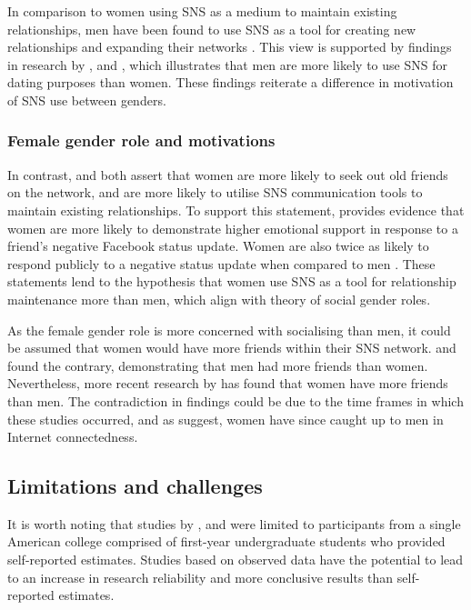 In comparison to women using SNS as a medium to maintain existing relationships, men have been found to use SNS as a tool for creating new relationships and expanding their networks \citep{Mazman2011}. This view is supported by findings in research by \citet{Muscanell2012}, \citet{Raacke2008} and \citet{Haferkamp2012}, which illustrates that men are more likely to use SNS for dating purposes than women. These findings reiterate a difference in motivation of SNS use between genders. 

\subsubsection{Female gender role and motivations}

In contrast, \citet{Mazman2011} and \citet{Muscanell2012} both assert that women are more likely to seek out old friends on the network, and are more likely to utilise SNS communication tools to maintain existing relationships. To support this statement, \citet{Joiner2014} provides evidence that women are more likely to demonstrate higher emotional support in response to a friend's negative Facebook status update. Women are also twice as likely to respond publicly to a negative status update when compared to men \citep[p. 167]{Joiner2014}. These statements lend to the hypothesis that women use SNS as a tool for relationship maintenance more than men, which align with  theory of social gender roles.

As the female gender role is more concerned with socialising than men, it could be assumed that women would have more friends within their SNS network. \citet{Raacke2008} and \citet{Fogel2009} found the contrary, demonstrating that men had more friends than women. Nevertheless, more recent research by \citet{McAndrew2012} has found that women have more friends than men. The contradiction in findings could be due to the time frames in which these studies occurred, and as \citet{Fallows2005} suggest, women have since caught up to men in Internet connectedness.

\subsection{Limitations and challenges}

It is worth noting that studies by \citet{Raacke2008}, \citet{Muscanell2012} and \citet{Joiner2014} were limited to participants from a single American college comprised of first-year undergraduate students who provided self-reported estimates. Studies based on observed data have the potential to lead to an increase in research reliability and more conclusive results than self-reported estimates.

